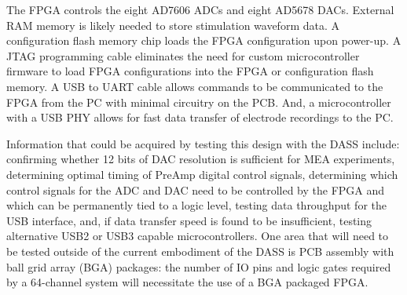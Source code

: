 The FPGA controls the eight AD7606 ADCs and eight AD5678 DACs.  External RAM memory is likely needed to store stimulation waveform data.  A configuration flash memory chip loads the FPGA configuration upon power-up.  A JTAG programming cable eliminates the need for custom microcontroller firmware to load FPGA configurations into the FPGA or configuration flash memory.  A USB to UART cable allows commands to be communicated to the FPGA from the PC with minimal circuitry on the PCB.  And, a microcontroller with a USB PHY allows for fast data transfer of electrode recordings to the PC.

Information that could be acquired by testing this design with the DASS include: confirming whether 12 bits of DAC resolution is sufficient for MEA experiments, determining optimal timing of PreAmp digital control signals, determining which control signals for the ADC and DAC need to be controlled by the FPGA and which can be permanently tied to a logic level, testing data throughput for the USB interface, and, if data transfer speed is found to be insufficient, testing alternative USB2 or USB3 capable microcontrollers.  One area that will need to be tested outside of the current embodiment of the DASS is PCB assembly with ball grid array (BGA) packages: the number of IO pins and logic gates required by a 64-channel system will necessitate the use of a BGA packaged FPGA.
